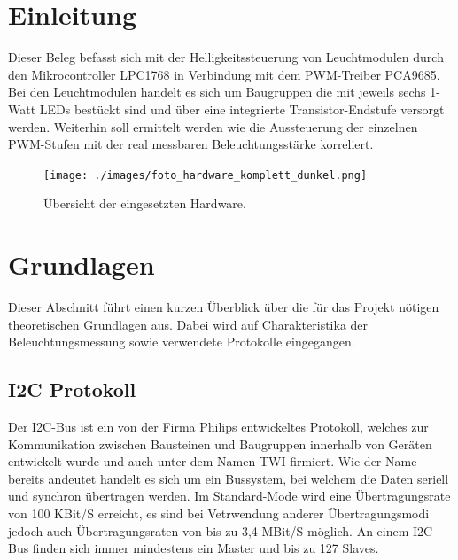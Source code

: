 \documentclass[a4paper,12pt]{scrartcl}
\begin{document}

\tableofcontents

\clearpage

\onehalfspacing


\clearpage
\listoffigures

\clearpage
\section{Einleitung}
Dieser Beleg befasst sich mit der Helligkeitssteuerung von Leuchtmodulen durch den Mikrocontroller LPC1768 in Verbindung mit dem PWM-Treiber PCA9685. Bei den
Leuchtmodulen handelt es sich um Baugruppen die mit jeweils sechs 1-Watt LEDs best\"uckt sind und \"uber eine integrierte Transistor-Endstufe versorgt
werden. Weiterhin soll ermittelt werden wie die Aussteuerung der einzelnen PWM-Stufen mit der real messbaren Beleuchtungsst\"arke korreliert. 
\begin{figure}[htb]
  \begin{center}
    \texttt{[image: ./images/foto\_hardware\_komplett\_dunkel.png]}
  \end{center}
\caption[\"Ubersicht der eingesetzten Hardware, Quelle: Autoren]{\label{fotohwuebersicht}\"Ubersicht der eingesetzten Hardware.}
\end{figure}

\clearpage
\section{Grundlagen}

Dieser Abschnitt führt einen kurzen \"Uberblick \"uber die für das Projekt nötigen theoretischen Grundlagen aus. Dabei wird auf Charakteristika der
Beleuchtungsmessung sowie verwendete Protokolle eingegangen.

\subsection{I2C Protokoll}

Der I2C-Bus ist ein von der Firma Philips entwickeltes Protokoll, welches zur Kommunikation zwischen Bausteinen und Baugruppen innerhalb von Ger\"aten
entwickelt wurde und auch unter dem Namen TWI firmiert. Wie der Name bereits andeutet handelt es sich um ein Bussystem, bei welchem die Daten seriell und
synchron \"ubertragen werden. Im Standard-Mode wird eine \"Ubertragungsrate von 100 KBit/S erreicht, es sind bei Vetrwendung anderer \"Ubertragungsmodi jedoch
auch \"Ubertragungsraten von bis zu 3,4 MBit/S m\"oglich. An einem I2C-Bus finden sich immer mindestens ein Master und bis zu 127 Slaves.
\end{document}
